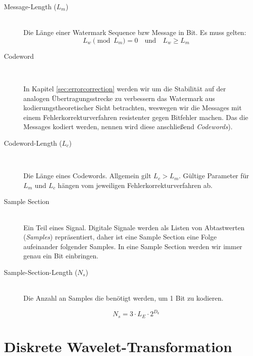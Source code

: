 \begin{description}
\item[Message-Length (${L}_{m}$)] \hfill \\ 
Die L\"ange einer Watermark Sequence bzw Message in Bit. Es muss gelten: 
	 \begin{equation}
		 {L}_{w} \pmod{{L}_{m}} = 0 \quad\mbox{und}\quad {L}_{w}\geq{L}_{m} \label{equ:wmkseqlength}
	 \end{equation}
	 
\item[Codeword] \hfill \\ 

In Kapitel \ref{sec:errorcorrection} werden wir um die Stabilit\"at auf der analogen Übertragungsstrecke zu verbessern das Watermark aus kodierungstheoretischer Sicht betrachten, weswegen wir die Messages mit einem Fehlerkorrekturverfahren resistenter gegen Bitfehler machen. Das die Messages kodiert werden, nennen wird diese anschließend \textit{Codewords}).

\item[Codeword-Length (${L}_{c}$)] \hfill \\ 

Die Länge eines Codewords. Allgemein gilt ${L}_{c} > {L}_{m}$. Gültige Parameter für ${L}_{m}$ und ${L}_{c}$ hängen vom jeweiligen Fehlerkorrekturverfahren ab.
	 
\item[Sample Section] \hfill \\ 
Ein Teil eines Signal. Digitale Signale werden als Listen von Abtastwerten (\textit{Samples}) repräsentiert, daher ist eine Sample Section eine Folge aufeinander folgender Samples. In eine Sample Section werden wir immer genau ein Bit einbringen.
	 
\item[Sample-Section-Length (${N}_{s}$)] \hfill \\
Die Anzahl an Samples die ben\"otigt werden, um 1 Bit zu kodieren. 

	 \begin{equation}
		 {N}_{s} = 3 \cdot {L}_{E} \cdot 2 ^ {{D}_{k}} \label{equ:samplseclength}
	 \end{equation}
	
\end{description}

\section{Diskrete Wavelet-Transformation}  
	

